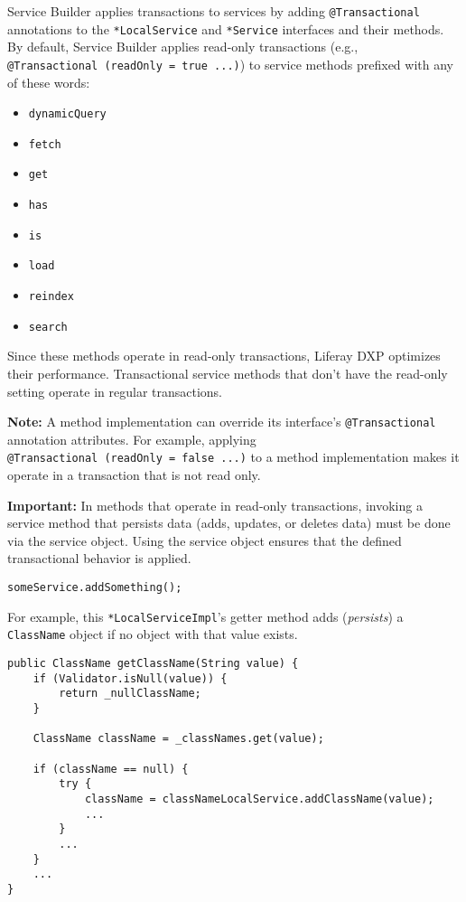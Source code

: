 Service Builder applies transactions to services by adding
\texttt{@Transactional} annotations to the \texttt{*LocalService} and
\texttt{*Service} interfaces and their methods. By default, Service
Builder applies read-only transactions (e.g.,
\texttt{@Transactional\ (readOnly\ =\ true\ ...)}) to service methods
prefixed with any of these words:

\begin{itemize}
\tightlist
\item
  \texttt{dynamicQuery}
\item
  \texttt{fetch}
\item
  \texttt{get}
\item
  \texttt{has}
\item
  \texttt{is}
\item
  \texttt{load}
\item
  \texttt{reindex}
\item
  \texttt{search}
\end{itemize}

Since these methods operate in read-only transactions, Liferay DXP
optimizes their performance. Transactional service methods that don't
have the read-only setting operate in regular transactions.

\noindent\hrulefill

\textbf{Note:} A method implementation can override its interface's
\texttt{@Transactional} annotation attributes. For example, applying
\texttt{@Transactional\ (readOnly\ =\ false\ ...)} to a method
implementation makes it operate in a transaction that is not read only.

\noindent\hrulefill

\textbf{Important:} In methods that operate in read-only transactions,
invoking a service method that persists data (adds, updates, or deletes
data) must be done via the service object. Using the service object
ensures that the defined transactional behavior is applied.

\begin{verbatim}
someService.addSomething();
\end{verbatim}

For example, this \texttt{*LocalServiceImpl}'s getter method adds
(\emph{persists}) a \texttt{ClassName} object if no object with that
value exists.

\begin{verbatim}
public ClassName getClassName(String value) {
    if (Validator.isNull(value)) {
        return _nullClassName;
    }

    ClassName className = _classNames.get(value);

    if (className == null) {
        try {
            className = classNameLocalService.addClassName(value);
            ...
        }
        ...
    }
    ...
}
\end{verbatim}

